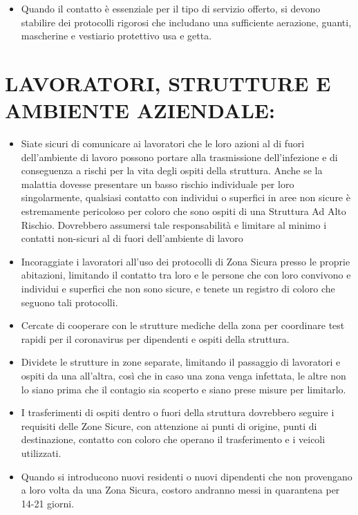 \documentclass[onecolumn,journal]{IEEEtran}
\begin{document}
\begin{multicols}{2}
\begin{itemize}
\item Quando il contatto è essenziale per il tipo di servizio offerto, si devono stabilire dei protocolli rigorosi che includano una sufficiente aerazione, guanti, mascherine e vestiario protettivo usa e getta.

\end{itemize}

\section*{LAVORATORI, STRUTTURE E AMBIENTE AZIENDALE:}

\begin{itemize}
  \item Siate sicuri di comunicare ai lavoratori che le loro azioni al di fuori dell’ambiente di lavoro possono portare alla trasmissione dell’infezione e di conseguenza a rischi per la vita degli ospiti della struttura. Anche se la malattia dovesse presentare un basso rischio individuale per loro singolarmente, qualsiasi contatto con individui o superfici in aree non sicure è estremamente pericoloso per coloro che sono ospiti di una Struttura Ad Alto Rischio. Dovrebbero assumersi tale responsabilità e limitare al minimo i contatti non-sicuri al di fuori dell’ambiente di lavoro
  \item Incoraggiate i lavoratori all’uso dei protocolli di Zona Sicura presso le proprie abitazioni, limitando il contatto tra loro e le persone che con loro convivono e individui e superfici che non sono sicure, e tenete un registro di coloro che seguono tali protocolli.
  \item Cercate di cooperare con le strutture mediche della zona per coordinare test rapidi per il coronavirus per dipendenti e ospiti della struttura.
  \item Dividete le strutture in zone separate, limitando il passaggio di lavoratori e ospiti da una all’altra, così che in caso una zona venga infettata, le altre non lo siano prima che il contagio sia scoperto e siano prese misure per limitarlo.
  \item I trasferimenti di ospiti dentro o fuori della struttura dovrebbero seguire i requisiti delle Zone Sicure, con attenzione ai punti di origine, punti di destinazione, contatto con coloro che operano il trasferimento e i veicoli utilizzati.
  \item Quando si introducono nuovi residenti o nuovi dipendenti che non provengano a loro volta da una Zona Sicura, costoro andranno messi in quarantena per 14-21 giorni.

\end{itemize}
\end{multicols}
\end{document}
